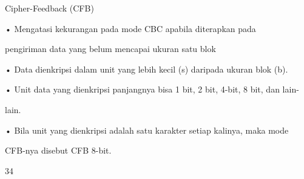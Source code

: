 \documentclass{article}
\begin{document}

Cipher-Feedback (CFB)

• Mengatasi kekurangan pada mode CBC apabila diterapkan pada 

pengiriman data yang belum mencapai ukuran satu blok  

• Data dienkripsi dalam unit yang lebih kecil (s) daripada ukuran blok (b). 

• Unit data  yang dienkripsi panjangnya bisa 1 bit, 2 bit, 4-bit, 8 bit, dan lain-

lain. 

• Bila unit yang dienkripsi adalah satu karakter setiap kalinya, maka mode 

CFB-nya disebut CFB 8-bit. 

34
\end{document}

